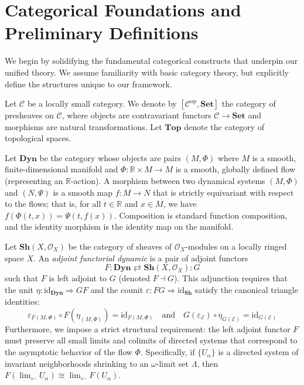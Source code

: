 \section{Categorical Foundations and Preliminary Definitions}
\label{sec:cat_found}

We begin by solidifying the fundamental categorical constructs that underpin our unified theory. We assume familiarity with basic category theory, but explicitly define the structures unique to our framework.

Let $\mathcal{C}$ be a locally small category. We denote by $[\mathcal{C}^\text{op}, \mathbf{Set}]$ the category of presheaves on $\mathcal{C}$, where objects are contravariant functors $\mathcal{C} \to \mathbf{Set}$ and morphisms are natural transformations. Let $\mathbf{Top}$ denote the category of topological spaces.

\begin{definition}
\label{def:category_dyn}
Let $\mathbf{Dyn}$ be the category whose objects are pairs $(M, \Phi)$ where $M$ is a smooth, finite-dimensional manifold and $\Phi: \mathbb{R} \times M \to M$ is a smooth, globally defined flow (representing an $\mathbb{R}$-action). A morphism between two dynamical systems $(M, \Phi)$ and $(N, \Psi)$ is a smooth map $f: M \to N$ that is strictly equivariant with respect to the flows; that is, for all $t \in \mathbb{R}$ and $x \in M$, we have $f(\Phi(t, x)) = \Psi(t, f(x))$. Composition is standard function composition, and the identity morphism is the identity map on the manifold.
\end{definition}

\begin{definition}
\label{def:adj_dyn}
Let $\mathbf{Sh}(X, \mathcal{O}_X)$ be the category of sheaves of $\mathcal{O}_X$-modules on a locally ringed space $X$. An \emph{adjoint functorial dynamic} is a pair of adjoint functors
\[ F: \mathbf{Dyn} \rightleftarrows \mathbf{Sh}(X, \mathcal{O}_X) : G \]
such that $F$ is left adjoint to $G$ (denoted $F \dashv G$). This adjunction requires that the unit $\eta: \text{id}_{\mathbf{Dyn}} \Rightarrow GF$ and the counit $\varepsilon: FG \Rightarrow \text{id}_{\mathbf{Sh}}$ satisfy the canonical triangle identities:
\[ \varepsilon_{F(M,\Phi)} \circ F(\eta_{(M,\Phi)}) = \text{id}_{F(M,\Phi)} \quad \text{and} \quad G(\varepsilon_{\mathcal{E}}) \circ \eta_{G(\mathcal{E})} = \text{id}_{G(\mathcal{E})} \]
Furthermore, we impose a strict structural requirement: the left adjoint functor $F$ must preserve all small limits and colimits of directed systems that correspond to the asymptotic behavior of the flow $\Phi$. Specifically, if $\{U_\alpha\}$ is a directed system of invariant neighborhoods shrinking to an $\omega$-limit set $\Lambda$, then $F(\lim_{\longleftarrow} U_\alpha) \cong \lim_{\longleftarrow} F(U_\alpha)$.
\end{definition}

